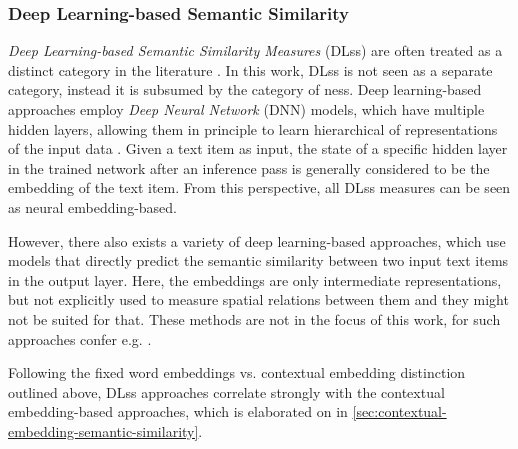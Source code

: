 \documentclass[11pt]{scrreprt}
\let\citef\cite  %
\let\cite\parencite  %
\begin{document}
\subsubsection{Deep Learning-based Semantic Similarity}
\label{sec:deep-learning-based-semantic-similarity}
\textit{Deep Learning-based Semantic Similarity Measures} (DL\gls{ss}) are often treated as a distinct category in the literature \cite{harispeSemanticSimilarityNatural2015, chandrasekaranEvolutionSemanticSimilarity2021, hanSurveyTechniquesApplications2021, zadSurveyDeepLearning2021}. In this work, DL\gls{ss} is not seen as a separate category, instead it is subsumed by the category of \gls{ness}. Deep learning-based approaches employ \textit{Deep Neural Network} (DNN) models, which have multiple hidden layers, allowing them in principle to learn hierarchical of representations of the input data \cite{goodfellowDeepLearning2016}. Given a text item as input, the state of a specific hidden layer in the trained network after an inference pass is generally considered to be the embedding of the text item. From this perspective, all DL\gls{ss} measures can be seen as neural embedding-based. 

However, there also exists a variety of deep learning-based approaches, which use models that directly predict the semantic similarity between two input text items in the output layer. Here, the embeddings are only intermediate representations, but not explicitly used to measure spatial relations between them and they might not be suited for that. These methods are not in the focus of this work, for such approaches confer e.g. \citef{taiImprovedSemanticRepresentations2015, hePairwiseWordInteraction2016, shaoHCTISemEval2017Task2017, tianECNUSemEval2017Task2017, wangSentenceSimilarityLearning2017, lopez-gazpioWordNgramAttention2019, tienSentenceModelingMultiple2019, tienSentenceModelingMultiple2019a, zhengDetectionMedicalText2019}.

Following the fixed word embeddings vs. contextual embedding distinction outlined above, DL\gls{ss} approaches correlate strongly with the contextual embedding-based approaches, which is elaborated on in \cref{sec:contextual-embedding-semantic-similarity}.

%
\end{document}
